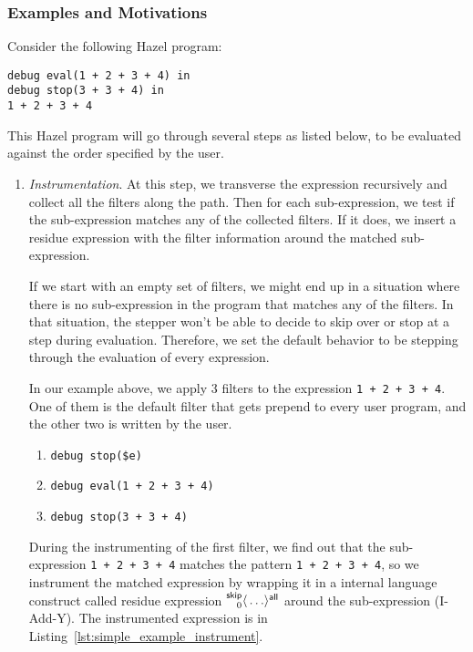 
\subsubsection{Examples and Motivations}\label{sec:filter_example}

Consider the following Hazel program:
\lstset{xleftmargin=1in}
\begin{lstlisting}[language=hazel,caption={A simple Hazel program}]
debug eval(1 + 2 + 3 + 4) in
debug stop(3 + 3 + 4) in
1 + 2 + 3 + 4\end{lstlisting}

This Hazel program will go through several steps as listed below, to
be evaluated against the order specified by the user.

\begin{enumerate}
\item \emph{Instrumentation}. \label{num:simple_example_instrument} At
  this step, we transverse the expression recursively and collect all
  the filters along the path. Then for each sub-expression, we test if
  the sub-expression matches any of the collected filters. If it does,
  we insert a residue expression with the filter information around
  the matched sub-expression.

  If we start with an empty set of filters, we might end up in a
  situation where there is no sub-expression in the program that
  matches any of the filters. In that situation, the stepper won't be
  able to decide to skip over or stop at a step during evaluation.
  Therefore, we set the default behavior to be stepping through the
  evaluation of every expression.

  In our example above, we apply 3 filters to the expression
  \lstinline[language=hazel]{1 + 2 + 3 + 4}. One of them is the
  default filter that gets prepend to every user program, and the
  other two is written by the user.

  \begin{enumerate}
  \item \lstinline[language=hazel]{debug stop($e)}
  \item \lstinline[language=hazel]{debug eval(1 + 2 + 3 + 4)}
  \item \lstinline[language=hazel]{debug stop(3 + 3 + 4)}
  \end{enumerate}

  During the instrumenting of the first filter, we find out that the
  sub-expression \lstinline[language=hazel]{1 + 2 + 3 + 4} matches the
  pattern \lstinline[language=hazel]{1 + 2 + 3 + 4}, so we instrument
  the matched expression by wrapping it in a internal language
  construct called residue expression
  \(\prescript{\mathsf{skip}}{0}{\langle} \ldots \rangle^{\mathsf{all}}\) around the sub-expression
  (I-Add-Y). The instrumented expression is in Listing~\ref{lst:simple_example_instrument}.


\end{enumerate}
